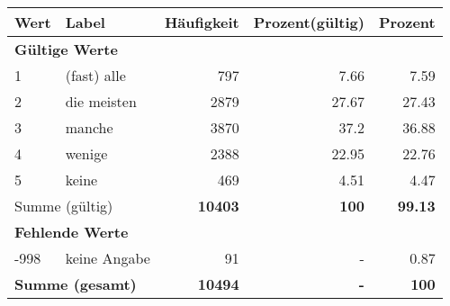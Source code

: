      \begin{longtable}{lXrrr}
     \toprule
     \textbf{Wert} & \textbf{Label} & \textbf{Häufigkeit} & \textbf{Prozent(gültig)} & \textbf{Prozent} \\
     \endhead
     \midrule
     \multicolumn{5}{l}{\textbf{Gültige Werte}}\\

     1 &
     \multicolumn{1}{X}{ (fast) alle   } &


       \num{797} &
       \num[round-mode=places,round-precision=2]{7,66} &
         \num[round-mode=places,round-precision=2]{7,59} \\

     2 &
     \multicolumn{1}{X}{ die meisten   } &


       \num{2879} &
       \num[round-mode=places,round-precision=2]{27,67} &
         \num[round-mode=places,round-precision=2]{27,43} \\

     3 &
     \multicolumn{1}{X}{ manche   } &


       \num{3870} &
       \num[round-mode=places,round-precision=2]{37,2} &
         \num[round-mode=places,round-precision=2]{36,88} \\

     4 &
     \multicolumn{1}{X}{ wenige   } &


       \num{2388} &
       \num[round-mode=places,round-precision=2]{22,95} &
         \num[round-mode=places,round-precision=2]{22,76} \\

     5 &
     \multicolumn{1}{X}{ keine   } &


       \num{469} &
       \num[round-mode=places,round-precision=2]{4,51} &
         \num[round-mode=places,round-precision=2]{4,47} \\
     \midrule
     \multicolumn{2}{l}{Summe (gültig)} &
       \textbf{\num{10403}} &
     \textbf{100} &
       \textbf{\num[round-mode=places,round-precision=2]{99,13}} \\
     \multicolumn{5}{l}{\textbf{Fehlende Werte}}\\
       -998 &
       keine Angabe &
         \num{91} &
        - &
         \num[round-mode=places,round-precision=2]{0,87} \\
     \midrule
     \multicolumn{2}{l}{\textbf{Summe (gesamt)}} &
          \textbf{\num{10494}} &
        \textbf{-} &
        \textbf{100} \\
     \bottomrule
     \end{longtable}
     
